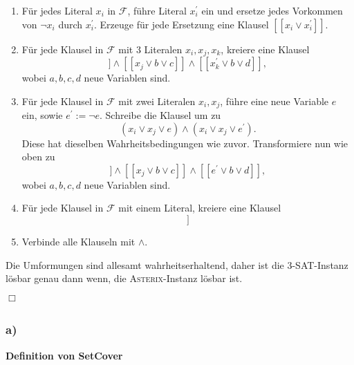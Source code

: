 \documentclass{article}
\begin{document}
\begin{enumerate}
   \item Für jedes Literal $x_i$ in $\mathcal{F}$, führe Literal $x_i^\prime$
      ein und ersetze jedes Vorkommen von $\neg x_i$ durch $x_i^\prime$. Erzeuge
      für jede Ersetzung eine Klausel $[[x_i \vee x_i^\prime]]$.
   \item Für jede Klausel in $\mathcal{F}$ mit 3 Literalen $x_i, x_j, x_k$, kreiere eine Klausel 
      \begin{equation*}
         [[x_i^\prime \vee a \vee b]] \wedge [[x_j \vee b \vee c]] \wedge [[x_k^\prime \vee b
         \vee d]],
      \end{equation*} wobei $a, b, c, d$ neue Variablen sind.
   \item Für jede Klausel in $\mathcal{F}$ mit zwei Literalen $x_i, x_j$, führe
      eine neue Variable $e$ ein, sowie $e^\prime := \neg e$. Schreibe die
      Klausel um zu
      \begin{equation*}
         (x_i \vee x_j \vee e) \wedge (x_i \vee x_j \vee e^\prime).
      \end{equation*}
      Diese hat dieselben Wahrheitsbedingungen wie zuvor. Transformiere nun wie
      oben zu
      \begin{equation*}
         [[x_i^\prime \vee a \vee b]] \wedge [[x_j \vee b \vee c]] \wedge [[e^\prime \vee b
         \vee d]],
      \end{equation*} wobei $a, b, c, d$ neue Variablen sind.
   \item Für jede Klausel in $\mathcal{F}$ mit einem Literal, kreiere eine
      Klausel
      \begin{equation*}
         [[x_i]]
      \end{equation*}
   \item Verbinde alle Klauseln mit $\wedge$.
\end{enumerate}

Die Umformungen sind allesamt wahrheitserhaltend, daher ist die
\textsc{3-SAT}-Instanz lösbar genau dann wenn, die \textsc{Asterix}-Instanz
lösbar ist.

\hfill{}$\Box$
\subsection{} 
\subsubsection{a)}

\textbf{Definition von SetCover}
\vspace{\baselineskip}
\end{document}
